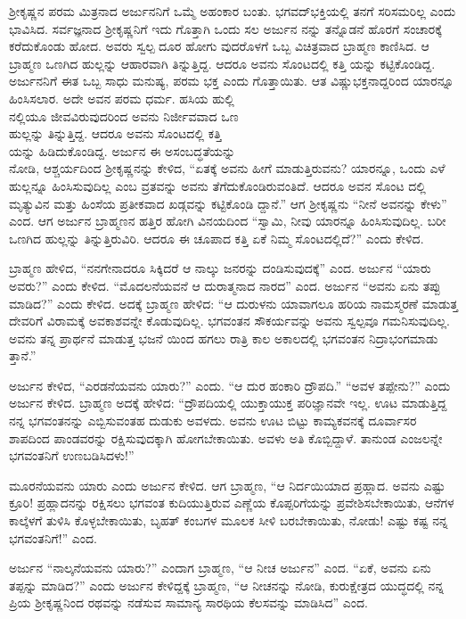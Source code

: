 ಶ್ರೀಕೃಷ್ಣನ ಪರಮ ಮಿತ್ರನಾದ ಅರ್ಜುನನಿಗೆ ಒಮ್ಮೆ ಅಹಂಕಾರ ಬಂತು. ಭಗವದ್​ಭಕ್ತಿಯಲ್ಲಿ ತನಗೆ ಸರಿಸಮರಿಲ್ಲ ಎಂದು ಭಾವಿಸಿದ. ಸರ್ವಜ್ಞನಾದ ಶ್ರೀಕೃಷ್ಣನಿಗೆ ಇದು ಗೊತ್ತಾಗಿ ಒಂದು ಸಲ ಅರ್ಜುನ ನನ್ನು ತನ್ನೊಡನೆ ಹೊರಗೆ ಸಂಚಾರಕ್ಕೆ ಕರೆದುಕೊಂಡು ಹೋದ. ಅವರು ಸ್ವಲ್ಪ ದೂರ ಹೋಗು ವುದರೊಳಗೆ ಒಬ್ಬ ವಿಚಿತ್ರವಾದ ಬ್ರಾಹ್ಮಣ ಕಾಣಿಸಿದ. ಆ ಬ್ರಾಹ್ಮಣ ಒಣಗಿದ ಹುಲ್ಲನ್ನು ಆಹಾರವಾಗಿ ತಿನ್ನುತ್ತಿದ್ದ. ಆದರೂ ಅವನು ಸೊಂಟದಲ್ಲಿ ಕತ್ತಿ ಯನ್ನು ಕಟ್ಟಿಕೊಂಡಿದ್ದ. ಅರ್ಜುನನಿಗೆ ಈತ ಒಬ್ಬ ಸಾಧು ಮನುಷ್ಯ, ಪರಮ ಭಕ್ತ ಎಂದು ಗೊತ್ತಾಯಿತು. ಆತ ವಿಷ್ಣುಭಕ್ತನಾದ್ದರಿಂದ ಯಾರನ್ನೂ ಹಿಂಸಿಸಲಾರ. ಅದೇ ಅವನ ಪರಮ ಧರ್ಮ. ಹಸಿಯ ಹುಲ್ಲಿ\\ನಲ್ಲಿಯೂ ಜೀವವಿರುವುದರಿಂದ ಅವನು ನಿರ್ಜೀವವಾದ ಒಣ\\ಹುಲ್ಲನ್ನು ತಿನ್ನುತ್ತಿದ್ದ. ಆದರೂ ಅವನು ಸೊಂಟದಲ್ಲಿ ಕತ್ತಿ\\ಯನ್ನು ಹಿಡಿದುಕೊಂಡಿದ್ದ. ಅರ್ಜುನ ಈ ಅಸಂಬದ್ಧತೆಯನ್ನು\\ನೋಡಿ, ಆಶ್ಚರ್ಯದಿಂದ ಶ್ರೀಕೃಷ್ಣನನ್ನು ಕೇಳಿದ, “ಏತಕ್ಕೆ ಅವನು ಹೀಗೆ ಮಾಡುತ್ತಿರುವನು? ಯಾರನ್ನೂ, ಒಂದು ಎಳೆ ಹುಲ್ಲನ್ನೂ ಹಿಂಸಿಸುವುದಿಲ್ಲ ಎಂಬ ವ್ರತವನ್ನು ಅವನು ತೆಗೆದುಕೊಂಡಿರುವಂತಿದೆ. ಆದರೂ ಅವನ ಸೊಂಟ ದಲ್ಲಿ ಮೃತ್ಯುವಿನ ಮತ್ತು ಹಿಂಸೆಯ ಪ್ರತೀಕವಾದ ಖಡ್ಗವನ್ನು ಕಟ್ಟಿಕೊಂಡಿ ದ್ದಾನೆ.” ಆಗ ಶ್ರೀಕೃಷ್ಣನು “ನೀನೆ ಅವನನ್ನು ಕೇಳು” ಎಂದ. ಆಗ ಅರ್ಜುನ ಬ್ರಾಹ್ಮಣನ ಹತ್ತಿರ ಹೋಗಿ ವಿನಯದಿಂದ “ಸ್ವಾಮಿ, ನೀವು ಯಾರನ್ನೂ ಹಿಂಸಿಸುವುದಿಲ್ಲ. ಬರೀ ಒಣಗಿದ ಹುಲ್ಲನ್ನು ತಿನ್ನುತ್ತಿರುವಿರಿ. ಆದರೂ ಈ ಚೂಪಾದ ಕತ್ತಿ ಏಕೆ ನಿಮ್ಮ ಸೊಂಟದಲ್ಲಿದೆ?” ಎಂದು ಕೇಳಿದ.

ಬ್ರಾಹ್ಮಣ ಹೇಳಿದ, “ನನಗೇನಾದರೂ ಸಿಕ್ಕಿದರೆ ಆ ನಾಲ್ಕು ಜನರನ್ನು ದಂಡಿಸುವುದಕ್ಕೆ” ಎಂದ. ಅರ್ಜುನ “ಯಾರು ಅವರು?” ಎಂದು ಕೇಳಿದ. “ಮೊದಲನೆಯವನೆ ಆ ದುರಾತ್ಮನಾದ ನಾರದ” ಎಂದ. ಅರ್ಜುನ “ಅವನು ಏನು ತಪ್ಪು ಮಾಡಿದ?” ಎಂದು ಕೇಳಿದ. ಅದಕ್ಕೆ ಬ್ರಾಹ್ಮಣ ಹೇಳಿದ: “ಆ ದುರುಳನು ಯಾವಾಗಲೂ ಹರಿಯ ನಾಮಸ್ಮರಣೆ ಮಾಡುತ್ತ ದೇವರಿಗೆ ವಿರಾಮಕ್ಕೆ ಅವಕಾಶವನ್ನೇ ಕೊಡುವುದಿಲ್ಲ. ಭಗವಂತನ ಸೌಕರ್ಯವನ್ನು ಅವನು ಸ್ವಲ್ಪವೂ ಗಮನಿಸುವುದಿಲ್ಲ. ಅವನು ತನ್ನ ಪ್ರಾರ್ಥನೆ ಮಾಡುತ್ತ ಭಜನೆ ಯಿಂದ ಹಗಲು ರಾತ್ರಿ ಕಾಲ ಅಕಾಲದಲ್ಲಿ ಭಗವಂತನ ನಿದ್ರಾಭಂಗಮಾಡು ತ್ತಾನೆ.”

ಅರ್ಜುನ ಕೇಳಿದ, “ಎರಡನೆಯವನು ಯಾರು?” ಎಂದು. “ಆ ದುರ ಹಂಕಾರಿ ದ್ರೌಪದಿ.” “ಅವಳ ತಪ್ಪೇನು?” ಎಂದು ಅರ್ಜುನ ಕೇಳಿದ. ಬ್ರಾಹ್ಮಣ ಅದಕ್ಕೆ ಹೇಳಿದ: “ದ್ರೌಪದಿಯಲ್ಲಿ ಯುಕ್ತಾಯುಕ್ತ ಪರಿಜ್ಞಾನವೇ ಇಲ್ಲ. ಊಟ ಮಾಡುತ್ತಿದ್ದ ನನ್ನ ಭಗವಂತನನ್ನು ಎಬ್ಬಿಸುವಂತಹ ದುಡುಕು ಅವಳದು. ಅವನು ಊಟ ಬಿಟ್ಟು ಕಾಮ್ಯಕವನಕ್ಕೆ ದೂರ್ವಾಸರ ಶಾಪದಿಂದ ಪಾಂಡವರನ್ನು ರಕ್ಷಿಸುವುದಕ್ಕಾಗಿ ಹೋಗಬೇಕಾಯಿತು. ಅವಳು ಅತಿ ಕೊಬ್ಬಿದ್ದಾಳೆ. ತಾನುಂಡ ಎಂಜಲನ್ನೇ ಭಗವಂತನಿಗೆ ಉಣಬಡಿಸಿದಳು!”

ಮೂರನೆಯವನು ಯಾರು ಎಂದು ಅರ್ಜುನ ಕೇಳಿದ. ಆಗ ಬ್ರಾಹ್ಮಣ, “ಆ ನಿರ್ದಯಿಯಾದ ಪ್ರಹ್ಲಾದ. ಅವನು ಎಷ್ಟು ಕ್ರೂರಿ! ಪ್ರಹ್ಲಾದನನ್ನು ರಕ್ಷಿಸಲು ಭಗವಂತ ಕುದಿಯುತ್ತಿರುವ ಎಣ್ಣೆಯ ಕೊಪ್ಪರಿಗೆಯನ್ನು ಪ್ರವೇಶಿಸಬೇಕಾಯಿತು, ಆನೆಗಳ ಕಾಲ್ಕೆಳಗೆ ತುಳಿಸಿ ಕೊಳ್ಳಬೇಕಾಯಿತು, ಬೃಹತ್ ಕಂಬಗಳ ಮೂಲಕ ಸೀಳಿ ಬರಬೇಕಾಯಿತು, ನೋಡು! ಎಷ್ಟು ಕಷ್ಟ ನನ್ನ ಭಗವಂತನಿಗೆ!” ಎಂದ.

ಅರ್ಜುನ “ನಾಲ್ಕನೆಯವನು ಯಾರು?” ಎಂದಾಗ ಬ್ರಾಹ್ಮಣ, “ಆ ನೀಚ ಅರ್ಜುನ” ಎಂದ. “ಏಕೆ, ಅವನು ಏನು ತಪ್ಪನ್ನು ಮಾಡಿದ?” ಎಂದು ಅರ್ಜುನ ಕೇಳಿದ್ದಕ್ಕೆ ಬ್ರಾಹ್ಮಣ, “ಆ ನೀಚನನ್ನು ನೋಡಿ, ಕುರುಕ್ಷೇತ್ರದ ಯುದ್ಧದಲ್ಲಿ ನನ್ನ ಪ್ರಿಯ ಶ್ರೀಕೃಷ್ಣನಿಂದ ರಥವನ್ನು ನಡೆಸುವ ಸಾಮಾನ್ಯ ಸಾರಥಿಯ ಕೆಲಸವನ್ನು ಮಾಡಿಸಿದ” ಎಂದ.

